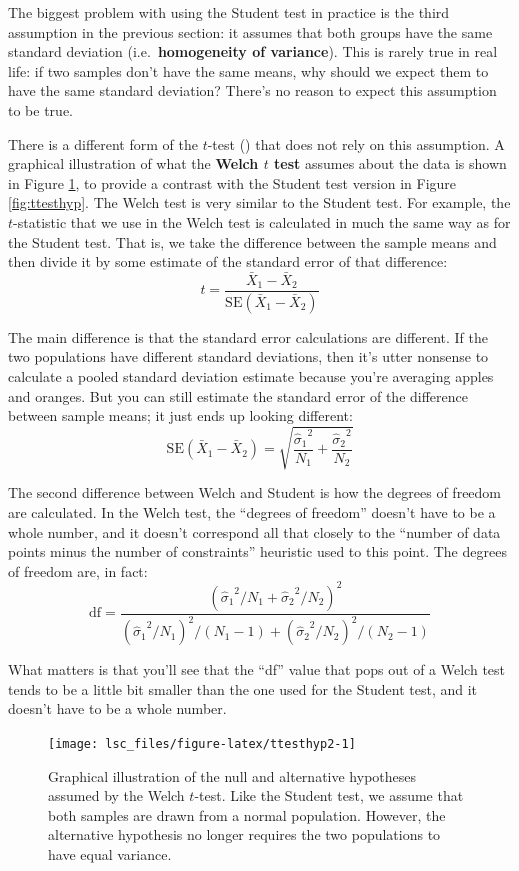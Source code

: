 \documentclass[
  11pt,
  a4paper,
  twoside,symmetric,openright]{book}
\theoremstyle{break}
\theoremstyle{break}
\begin{document}
The biggest problem with using the Student test in practice is the third assumption in the previous section: it assumes that both groups have the same standard deviation (i.e.~\textbf{homogeneity of variance}). This is rarely true in real life: if two samples don't have the same means, why should we expect them to have the same standard deviation? There's no reason to expect this assumption to be true.

There is a different form of the \(t\)-test () that does not rely on this assumption. A graphical illustration of what the \textbf{Welch \(t\) test} assumes about the data is shown in Figure \ref{fig:ttesthyp2}, to provide a contrast with the Student test version in Figure \ref{fig:ttesthyp}. The Welch test is very similar to the Student test. For example, the \(t\)-statistic that we use in the Welch test is calculated in much the same way as for the Student test. That is, we take the difference between the sample means and then divide it by some estimate of the standard error of that difference:
\[
t = \frac{\bar{X}_1 - \bar{X}_2}{\mbox{SE}({\bar{X}_1 - \bar{X}_2})}
\]

The main difference is that the standard error calculations are different. If the two populations have different standard deviations, then it's utter nonsense to calculate a pooled standard deviation estimate because you're averaging apples and oranges. But you can still estimate the standard error of the difference between sample means; it just ends up looking different:
\[
\mbox{SE}({\bar{X}_1 - \bar{X}_2}) = \sqrt{ \frac{{\hat{\sigma}_1}^2}{N_1} + \frac{{\hat{\sigma}_2}^2}{N_2} }
\]

The second difference between Welch and Student is how the degrees of freedom are calculated. In the Welch test, the ``degrees of freedom'' doesn't have to be a whole number, and it doesn't correspond all that closely to the ``number of data points minus the number of constraints'' heuristic used to this point. The degrees of freedom are, in fact:
\[
\mbox{df} = \frac{ ({\hat{\sigma}_1}^2 / N_1 + {\hat{\sigma}_2}^2 / N_2)^2 }{ ({\hat{\sigma}_1}^2 / N_1)^2 / (N_1 -1 ) + ({\hat{\sigma}_2}^2 / N_2)^2 / (N_2 -1 ) } 
\]

What matters is that you'll see that the ``df'' value that pops out of a Welch test tends to be a little bit smaller than the one used for the Student test, and it doesn't have to be a whole number.

\begin{figure}

{\centering \texttt{[image: lsc\_files/figure-latex/ttesthyp2-1]} 

}

\caption{Graphical illustration of the null and alternative hypotheses assumed by the Welch $t$-test. Like the Student test, we assume that both samples are drawn from a normal population. However, the alternative hypothesis no longer requires the two populations to have equal variance.}\label{fig:ttesthyp2}
\end{figure}
\end{document}
